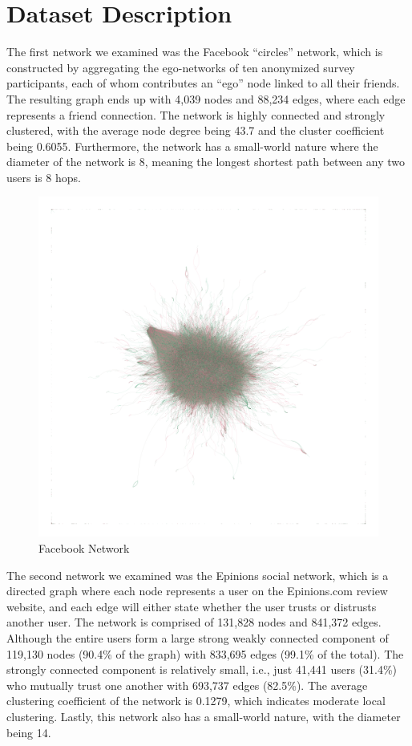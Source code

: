 \section{Dataset Description}



The first network we examined was the Facebook “circles” network, which is constructed by aggregating the ego-networks of ten anonymized survey participants, each of whom contributes an “ego” node linked to all their friends. The resulting graph ends up with 4,039 nodes and 88,234 edges, where each edge represents a friend connection. The network is highly connected and strongly clustered, with the average node degree being 43.7 and the cluster coefficient being 0.6055. Furthermore, the network has a small-world nature where the diameter of the network is 8, meaning the longest shortest path between any two users is 8 hops. 

\begin{figure}[ht]
    \centering
    \includegraphics[width=0.8\linewidth]{figures/init_fb.png}
    \caption{Facebook Network}
    \label{fig:enter-label}
\end{figure}

The second network we examined was the Epinions social network, which is a directed graph where each node represents a user on the Epinions.com review website, and each edge will either state whether the user trusts or distrusts another user. The network is comprised of 131,828 nodes and 841,372 edges. Although the entire users form a large strong weakly connected component of 119,130 nodes (90.4\% of the graph) with 833,695 edges (99.1\% of the total). The strongly connected component is relatively small, i.e., just 41,441 users (31.4\%) who mutually trust one another with 693,737 edges (82.5\%). The average clustering coefficient of the network is 0.1279, which indicates moderate local clustering. Lastly, this network also has a small-world nature, with the diameter being 14. 
